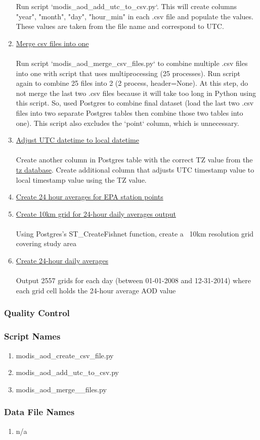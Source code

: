 \begin{enumerate}
Run script `modis\_aod\_add\_utc\_to\_csv.py`. This will create columns "year", "month", "day", "hour\_min" in each .csv file and populate the values. These values are taken from the file name and correspond to UTC.
\item \underline{Merge csv files into one}\\\\
Run script `modis\_aod\_merge\_csv\_files.py` to combine multiple .csv files into one with script that uses multiprocessing (25 processes). Run script again to combine 25 files into 2 (2 process, header=None). At this step, do not merge the last two .csv files because it will take too long in Python using this script. So, used Postgres to combine final dataset (load the last two .csv files into two separate Postgres tables then combine those two tables into one). This script also excludes the `point` column, which is unnecessary. 
\item \underline{Adjust UTC datetime to local datetime}\\\\
Create another column in Postgres table with the correct TZ value from the \href{https://en.wikipedia.org/wiki/List_of_tz_database_time_zones}{tz database}. Create additional column that adjusts UTC timestamp value to local timestamp value using the TZ value.
\item \underline{Create 24 hour averages for EPA station points}
\item \underline{Create 10km grid for 24-hour daily averages output}\\\\
Using Postgres's ST\_CreateFishnet function, create a ~10km resolution grid covering study area
\item \underline{Create 24-hour daily averages}\\\\
Output 2557 grids for each day (between 01-01-2008 and 12-31-2014) where each grid cell holds the 24-hour average AOD value 

\end{enumerate}

\subsubsection*{Quality Control}

\subsubsection*{Script Names}

\begin{enumerate}
\item modis\_aod\_create\_csv\_file.py
\item modis\_aod\_add\_utc\_to\_csv.py
\item modis\_aod\_merge\_\csv\_files.py
\end{enumerate}

\subsubsection*{Data File Names}

\begin{enumerate}
\item n/a
\end{enumerate}